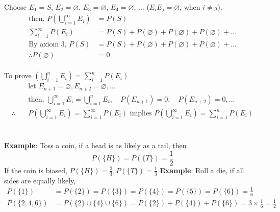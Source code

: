 \documentclass[11pt, letterpaper]{article}
\begin{document}
Choose $E_1 = S$, $E_2 = \varnothing$, $E_3 = \varnothing$, $E_4 = \varnothing$, $\dots$ ($E_iE_j = \varnothing$, when $i \not= j$). \\
\begin{align*}
  \text{then, } P \left( \bigcup_{i=1}^\infty E_i \right) &= P(S) \\
  \sum_{i=1}^\infty P(E_i) &= P(S) + P(\varnothing) + P(\varnothing) + P(\varnothing) + \dots \\
  \text{By axiom 3, } P(S) &= P(S) + P(\varnothing) + P(\varnothing) + P(\varnothing) + \dots \\
  \therefore P(\varnothing) &= 0
\end{align*} \\
To prove $\left( \bigcup_{i=1}^n E_i\right) = \sum_{i=1}^n P(E_i)$ \\
\begin{align*}
  &\text{let } E_{n+1} = \varnothing, E_{n+2} = \varnothing, \dots \\
  &\text{then, } \bigcup_{i=1}^\infty E_i = \bigcup_{i=1}^n E_i, \quad P(E_{n+1}) = 0, \quad P(E_{n+2}) = 0, \dots \\
  \therefore \quad &P \left( \bigcup_{i=1}^\infty E_i \right) = \sum_{i=1}^\infty P(E_i) \text{ implies } P \left( \bigcup_{i=1}^\infty E_i \right) = \sum_{i=1}^n P(E_i)
\end{align*} \\ \\
\noindent
\textbf{Example}: Toss a coin, if a head is as likely as a tail, then
\begin{equation*}
  P(\{H\}) = P(\{T\}) = \frac{1}{2}
\end{equation*}
If the coin is biased, $P(\{H\}) = \frac{2}{3}, P(\{T\}) = \frac{1}{3}$
\textbf{Example}: Roll a die, if all sides are equally likely,
\begin{align*}
  P(\{1\}) &= P(\{2\}) = P(\{3\}) = P(\{4\}) = P(\{5\}) = P(\{6\}) = \frac{1}{6} \\
  P(\{2,4,6\}) &= P(\{2\} \cup \{4\} \cup \{6\}) = P(\{2\}) + P(\{4\}) + P(\{6\}) = 3 \times \frac{1}{6} = \frac{1}{2}
\end{align*} \clearpage
\end{document}
